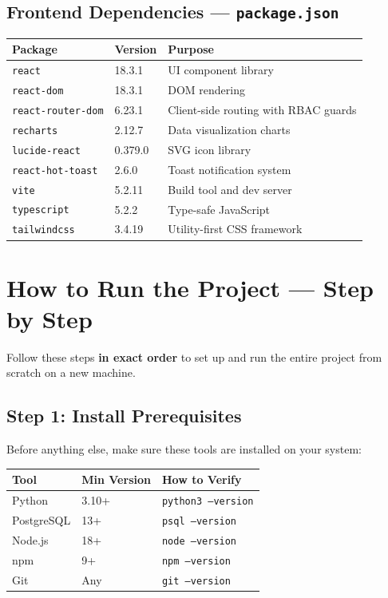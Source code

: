 \documentclass[12pt, a4paper]{article}
\begin{document}
\subsection{Frontend Dependencies --- \texttt{package.json}}

\begin{longtable}{p{5cm}p{2cm}p{7cm}}
\toprule
\textbf{Package} & \textbf{Version} & \textbf{Purpose} \\
\midrule
\endhead
\texttt{react} & 18.3.1 & UI component library \\
\texttt{react-dom} & 18.3.1 & DOM rendering \\
\texttt{react-router-dom} & 6.23.1 & Client-side routing with RBAC guards \\
\texttt{recharts} & 2.12.7 & Data visualization charts \\
\texttt{lucide-react} & 0.379.0 & SVG icon library \\
\texttt{react-hot-toast} & 2.6.0 & Toast notification system \\
\texttt{vite} & 5.2.11 & Build tool and dev server \\
\texttt{typescript} & 5.2.2 & Type-safe JavaScript \\
\texttt{tailwindcss} & 3.4.19 & Utility-first CSS framework \\
\bottomrule
\end{longtable}

\newpage

\section{How to Run the Project --- Step by Step}

Follow these steps \textbf{in exact order} to set up and run the entire project from scratch on a new machine.

\subsection{Step 1: Install Prerequisites}

Before anything else, make sure these tools are installed on your system:

\begin{longtable}{p{4cm}p{3cm}p{7cm}}
\toprule
\textbf{Tool} & \textbf{Min Version} & \textbf{How to Verify} \\
\midrule
\endhead
Python & 3.10+ & \texttt{python3 --version} \\
PostgreSQL & 13+ & \texttt{psql --version} \\
Node.js & 18+ & \texttt{node --version} \\
npm & 9+ & \texttt{npm --version} \\
Git & Any & \texttt{git --version} \\
\bottomrule
\end{longtable}
\end{document}
